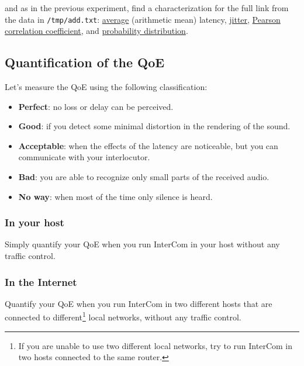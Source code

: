 \begin{enumerate}

  and as in the previous experiment, find a
  characterization for the full link from the data in \verb|/tmp/add.txt|:
  \href{https://en.wikipedia.org/wiki/Average}{average} (arithmetic
  mean) latency, \href{https://en.wikipedia.org/wiki/Jitter}{jitter},
  \href{https://en.wikipedia.org/wiki/Pearson_correlation_coefficient}{Pearson
    correlation coefficient}, and
  \href{https://en.wikipedia.org/wiki/List_of_probability_distributions}{probability
    distribution}.

\end{enumerate}

\subsection{Quantification of the QoE}

Let's measure the QoE using the following classification:
\begin{itemize}
\item \textbf{Perfect}: no loss or delay can be perceived.
\item \textbf{Good}: if you detect some minimal distortion in the
  rendering of the sound.
\item \textbf{Acceptable}: when the effects of the latency are
  noticeable, but you can communicate with your interlocutor.
\item \textbf{Bad}: you are able to recognize only small parts of the
  received audio.
\item \textbf{No way}: when most of the time only silence is heard.
\end{itemize}

\subsubsection{In your host}

Simply quantify your QoE when you run InterCom in your host without
any traffic control.

\subsubsection{In the Internet}

Quantify your QoE when you run InterCom in two different hosts that
are connected to different\footnote{If you are unable to use two
  different local networks, try to run InterCom in two hosts connected
  to the same router.} local networks, without any traffic control.

